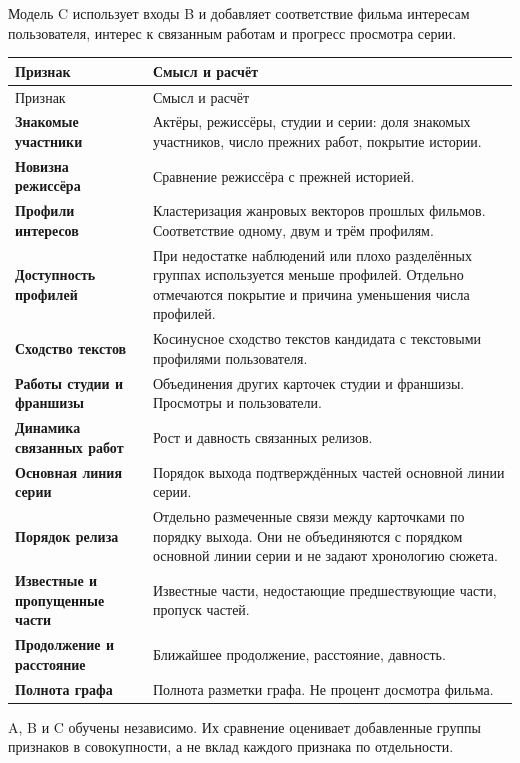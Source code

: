 \documentclass[11pt,a4paper]{article}
\begin{document}
Модель C использует входы B и добавляет соответствие фильма интересам пользователя, интерес к связанным работам и прогресс просмотра серии.

\begin{longtable}{>{\raggedright\arraybackslash}p{4.1cm}>{\raggedright\arraybackslash}p{10.8cm}}
\toprule
Признак & Смысл и расчёт \\
\midrule
\endfirsthead
\toprule
Признак & Смысл и расчёт \\
\midrule
\endhead
\textbf{Знакомые участники} & Актёры, режиссёры, студии и серии: доля знакомых участников, число прежних работ, покрытие истории. \\[4pt]
\textbf{Новизна режиссёра} & Сравнение режиссёра с прежней историей. \\[4pt]
\textbf{Профили интересов} & Кластеризация жанровых векторов прошлых фильмов. Соответствие одному, двум и трём профилям. \\[4pt]
\textbf{Доступность профилей} & При недостатке наблюдений или плохо разделённых группах используется меньше профилей. Отдельно отмечаются покрытие и причина уменьшения числа профилей. \\[4pt]
\textbf{Сходство текстов} & Косинусное сходство текстов кандидата с текстовыми профилями пользователя. \\[4pt]
\textbf{Работы студии и франшизы} & Объединения других карточек студии и франшизы. Просмотры и пользователи. \\[4pt]
\textbf{Динамика связанных работ} & Рост и давность связанных релизов. \\[4pt]
\textbf{Основная линия серии} & Порядок выхода подтверждённых частей основной линии серии. \\[4pt]
\textbf{Порядок релиза} & Отдельно размеченные связи между карточками по порядку выхода. Они не объединяются с порядком основной линии серии и не задают хронологию сюжета. \\[4pt]
\textbf{Известные и пропущенные части} & Известные части, недостающие предшествующие части, пропуск частей. \\[4pt]
\textbf{Продолжение и расстояние} & Ближайшее продолжение, расстояние, давность. \\[4pt]
\textbf{Полнота графа} & Полнота разметки графа. Не процент досмотра фильма. \\[4pt]
\bottomrule
\end{longtable}

A, B и C обучены независимо. Их сравнение оценивает добавленные группы признаков в совокупности, а не вклад каждого признака по отдельности.
\end{document}
